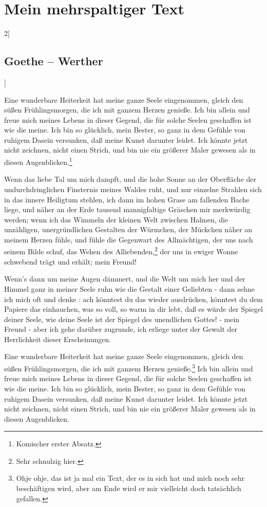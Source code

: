 
\chapter{Mein mehrspaltiger Text}


\begin{multicols}{2}[\section{Goethe – Werther}]

Eine wunderbare Heiterkeit hat meine ganze Seele eingenommen, gleich den süßen Frühlingsmorgen, die ich mit ganzem Herzen genieße. Ich bin allein und freue mich meines Lebens in dieser Gegend, die für solche Seelen geschaffen ist wie die meine. Ich bin so glücklich, mein Bester, so ganz in dem Gefühle von ruhigem Dasein versunken, daß meine Kunst darunter leidet. Ich könnte jetzt nicht zeichnen, nicht einen Strich, und bin nie ein größerer Maler gewesen als in diesen Augenblicken.\footnote{Komischer erster Absatz.}

Wenn das liebe Tal um mich dampft, und die hohe Sonne an der Oberfläche der undurchdringlichen Finsternis meines Waldes ruht, und nur einzelne Strahlen sich in das innere Heiligtum stehlen, ich dann im hohen Grase am fallenden Bache liege, und näher an der Erde tausend mannigfaltige Gräschen mir merkwürdig werden; wenn ich das Wimmeln der kleinen Welt zwischen Halmen, die unzähligen, unergründlichen Gestalten der Würmchen, der Mückchen näher an meinem Herzen fühle, und fühle die Gegenwart des Allmächtigen, der uns nach seinem Bilde schuf, das Wehen des Alliebenden,\footnote{Sehr schnulzig hier.} der uns in ewiger Wonne schwebend trägt und erhält; mein Freund!

Wenn's dann um meine Augen dämmert, und die Welt um mich her und der Himmel ganz in meiner Seele ruhn wie die Gestalt einer Geliebten - dann sehne ich mich oft und denke : ach könntest du das wieder ausdrücken, könntest du dem Papiere das einhauchen, was so voll, so warm in dir lebt, daß es würde der Spiegel deiner Seele, wie deine Seele ist der Spiegel des unendlichen Gottes! - mein Freund - aber ich gehe darüber zugrunde, ich erliege unter der Gewalt der Herrlichkeit dieser Erscheinungen.

Eine wunderbare Heiterkeit hat meine ganze Seele eingenommen, gleich den süßen Frühlingsmorgen, die ich mit ganzem Herzen genieße.\footnote{Ohje ohje, das ist ja mal ein Text, der es in sich hat und mich noch sehr beschäftigen wird, aber am Ende wird er mir vielleicht doch tatsächlich gefallen.} Ich bin allein und freue mich meines Lebens in dieser Gegend, die für solche Seelen geschaffen ist wie die meine. Ich bin so glücklich, mein Bester, so ganz in dem Gefühle von ruhigem Dasein versunken, daß meine Kunst darunter leidet. Ich könnte jetzt nicht zeichnen, nicht einen Strich, und bin nie ein größerer Maler gewesen als in diesen Augenblicken.


\end{multicols}
